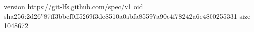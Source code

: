 version https://git-lfs.github.com/spec/v1
oid sha256:2d26787ff3bbcf0ff5269f3de8510a0abfa85597a90e4f78242a6e4800255331
size 1048672
